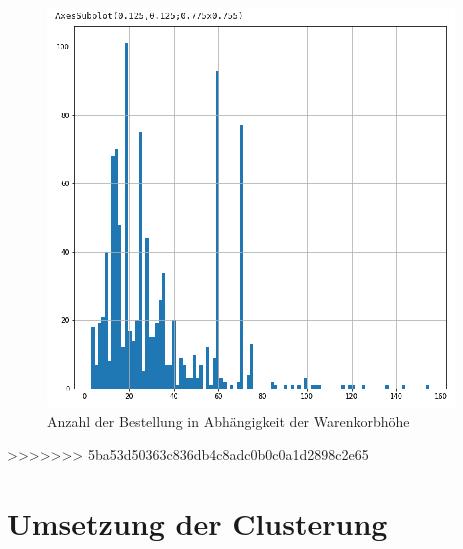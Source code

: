\begin{figure}[!ht]
	\centering
	\includegraphics[width=\linewidth]{images/chapter4/first_plot.eps}
	\caption{Anzahl der Bestellung in Abhängigkeit der Warenkorbhöhe}
	\label{img:plot_count_amount}
\end{figure}
>>>>>>> 5ba53d50363c836db4c8adc0b0c0a1d2898c2e65

\section{Umsetzung der Clusterung}
